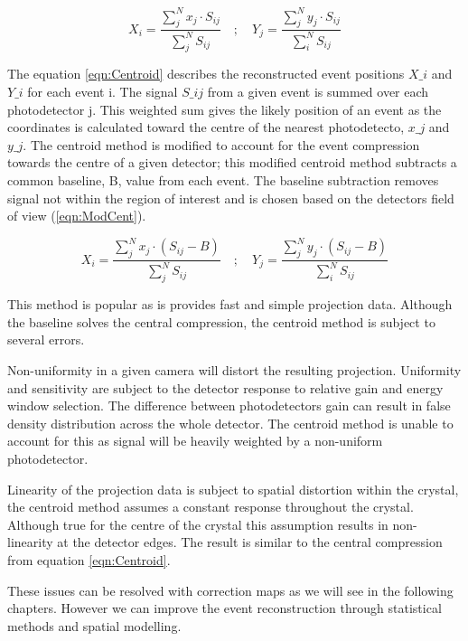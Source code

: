 \begin{equation} \label{eqn:Centroid}
        X_{i} = \frac{\sum^{N}_{j} x_{j} \cdot S_{ij}}{\sum^{N}_{j} S_{ij}} \quad ; \quad  Y_{j} = \frac{\sum^{N}_{j} y_{j} \cdot S_{ij}}{\sum^{N}_{i} S_{ij}}
\end{equation}

The equation \ref{eqn:Centroid} describes the reconstructed event positions $X\_i$ and $Y\_i$ for each event i. The signal $S\_{ij}$ from a given event is summed over each  photodetector j. This weighted sum gives the likely position of an event as the coordinates is calculated toward the centre of the nearest photodetecto, $x\_j$ and $y\_j$. The centroid method is modified to account for the event compression towards the centre of a given detector; this modified centroid method subtracts a common baseline, B, value from each event. The baseline subtraction removes signal not within the region of interest and is chosen based on the detectors field of view (\ref{eqn:ModCent}). 

\begin{equation} \label{eqn:ModCent}
        X_{i} = \frac{\sum^{N}_{j} x_{j} \cdot (S_{ij} - B)}{\sum^{N}_{j} S_{ij}} \quad ; \quad  Y_{j} = \frac{\sum^{N}_{j} y_{j} \cdot (S_{ij} - B)}{\sum^{N}_{i} S_{ij}}
\end{equation}

This method is popular as is provides fast and simple projection data. Although the baseline solves the central compression, the centroid method is subject to several errors. 

Non-uniformity in a given camera will distort the resulting projection. Uniformity and sensitivity are subject to the detector response to relative gain and energy window selection. The difference between photodetectors gain can result in false density distribution across the whole detector. The centroid method is unable to account for this as signal will be heavily weighted by a non-uniform photodetector. 

Linearity of the projection data is subject to spatial distortion within the crystal, the centroid method assumes a constant response throughout the crystal. Although true for the centre of the crystal this assumption results in non-linearity at the detector edges. The result is similar to the central compression from equation \ref{eqn:Centroid}.

These issues can be resolved with correction maps as we will see in the following chapters. However we can improve the event reconstruction through statistical methods and spatial modelling. 

